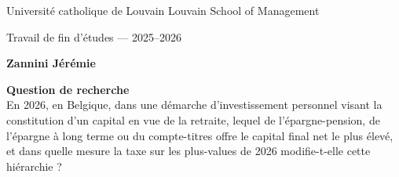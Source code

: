 \documentclass[20pt]{extarticle}
\begin{document}
\begin{tcolorbox}[headerbox]
\centering\color{white}
{\large Universit\'e catholique de Louvain \textbullet{} Louvain School of Management\par}
\vspace{4pt}
{\normalsize Travail de fin d'\'etudes --- 2025--2026\par}
\vspace{10pt}
{\fontsize{20}{20}\selectfont\bfseries Zannini Jérémie\par}
\end{tcolorbox}

\vspace{6pt}

\begin{tcolorbox}[highlightbox]
\Large\centering
\textbf{Question de recherche}\\[5pt]
En 2026, en Belgique, dans une démarche d'investissement personnel
visant la constitution d'un capital en vue de la retraite, lequel de l'épargne-pension, 
de l'épargne à long terme ou
du compte-titres offre le capital final net
le plus élevé, et dans quelle mesure la
taxe sur les plus-values de 2026
modifie-t-elle cette hiérarchie ?
\end{tcolorbox}

\vspace{6pt}
\end{document}
